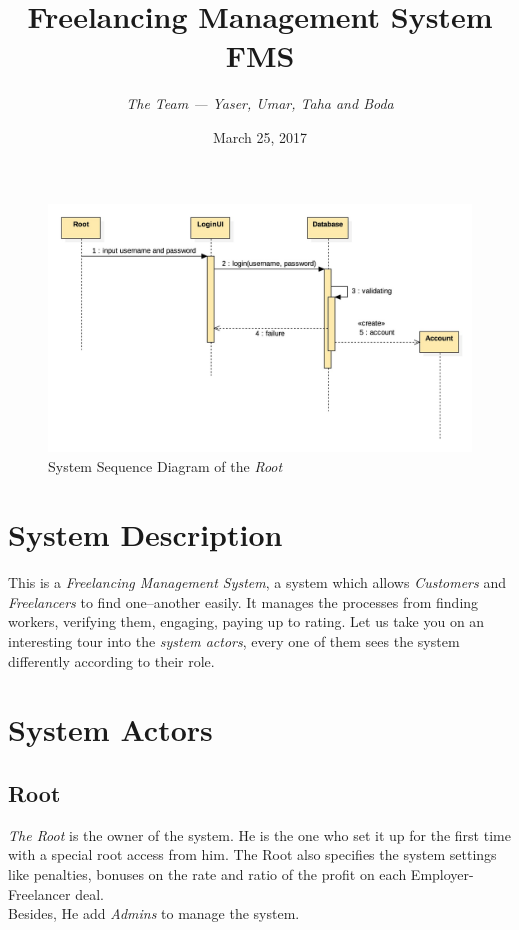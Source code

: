 \documentclass{article}
\begin{document}
    \title{Freelancing Management System \\
    \textbf{FMS}}
    \author{\textit{The Team --- Yaser, Umar, Taha and Boda}}
    \date{March 25, 2017}
\maketitle

\begin{figure}[ht!]
\centering
\includegraphics[width=128mm]{SequanceDiagram_Root.jpg}
\caption{System Sequence Diagram of the \textit{Root}}
\end{figure}

\newpage
\tableofcontents
\newpage



\section{System Description}
  \hspace{0.5cm} This is a \textit{Freelancing Management System}, a system which
  allows \textit{Customers } and \textit{Freelancers} to find
  one--another easily. It manages the processes from finding workers,
  verifying them, engaging, paying up to rating.
  \hspace{0.3cm}Let us take you on an interesting tour into the
  \textit{system actors}, every one of them sees the system differently
  according to their role.

\section{System Actors}
\subsection{Root}
\hspace{0.5cm} \textit{The Root} is the owner of the system. He is the one
who set it up for the first time with a special root access from him.
The Root also specifies the system settings like penalties,
bonuses on the rate and ratio of the profit on each Employer-Freelancer deal. \\
Besides, He add \textit{Admins} to manage the system.
\end{document}
